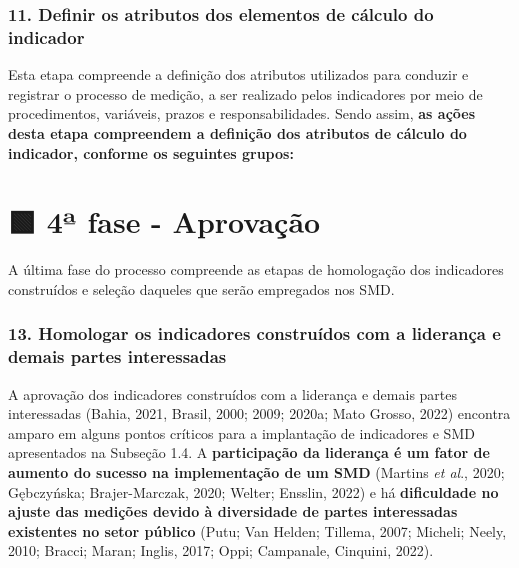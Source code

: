 \documentclass[
  letterpaper,
  DIV=11,
  numbers=noendperiod]{scrreprt}
\begin{document}
\hypertarget{definir-os-atributos-dos-elementos-de-cuxe1lculo-do-indicador}{%
\subsection*{11. Definir os atributos dos elementos de cálculo do
indicador}\label{definir-os-atributos-dos-elementos-de-cuxe1lculo-do-indicador}}

Esta etapa compreende a definição dos atributos utilizados para conduzir
e registrar o processo de medição, a ser realizado pelos indicadores por
meio de procedimentos, variáveis, prazos e responsabilidades. Sendo
assim, \textbf{as ações desta etapa compreendem a definição dos
atributos de cálculo do indicador, conforme os seguintes grupos:}

\hypertarget{uxaa-fase---aprovauxe7uxe3o}{%
\chapter*{🟩 4ª fase - Aprovação}\label{uxaa-fase---aprovauxe7uxe3o}}


{A última fase do processo compreende as etapas de homologação dos
indicadores construídos e seleção daqueles que serão empregados nos
SMD.}

\hypertarget{homologar-os-indicadores-construuxeddos-com-a-lideranuxe7a-e-demais-partes-interessadas}{%
\subsection*{13. Homologar os indicadores construídos com a liderança e
demais partes
interessadas}\label{homologar-os-indicadores-construuxeddos-com-a-lideranuxe7a-e-demais-partes-interessadas}}

A aprovação dos indicadores construídos com a liderança e demais partes
interessadas (Bahia, 2021, Brasil, 2000; 2009; 2020a; Mato Grosso, 2022)
encontra amparo em alguns pontos críticos para a implantação de
indicadores e SMD apresentados na Subseção 1.4. A \textbf{participação
da liderança é um fator de aumento do sucesso na implementação de um
SMD} (Martins \emph{et al}., 2020; Gębczyńska; Brajer-Marczak, 2020;
Welter; Ensslin, 2022) e há \textbf{dificuldade no ajuste das medições
devido à diversidade de partes interessadas existentes no setor público}
(Putu; Van Helden; Tillema, 2007; Micheli; Neely, 2010; Bracci; Maran;
Inglis, 2017; Oppi; Campanale, Cinquini, 2022).
\end{document}
